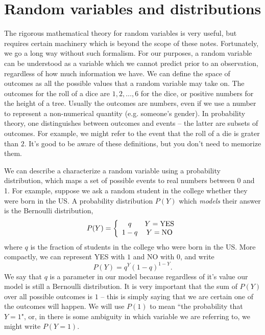 

\section{Random variables and distributions}

The rigorous mathematical theory for random variables is very useful, but requires certain machinery which is beyond the scope of these notes. Fortunately, we go a long way without such formalism. For our purposes, a random variable can be understood as a variable which we cannot predict prior to an observation, regardless of how much information we have.
We can define the space of  {\dfn outcomes} as all the possible values that a random variable may take on. The outcomes for the roll of a dice are $1,2,\dots,6$ for the dice, or positive numbers for the height of a tree.  Usually the outcomes are numbers, even if we use a number to represent a non-numerical quantity (e.g. someone's gender). In probability theory, one distinguishes between outcomes and {\dfn events} -- the latter are subsets of outcomes. For example, we might refer to the event that the roll of a die is grater than $2$. It's good to be aware of these definitions, but you don't need to memorize them.



We can describe a characterize a random variable using  a {\dfn probability distribution}, which maps a set of possible events to real numbers between 0 and 1.   For example, suppose we ask a random student in the college whether they were born in the US. A probability distribution $P(Y)$ which \emph{models} their answer is the {\dfn Bernoulli distribution},
\begin{equation}
P(Y) = \left\{ \begin{array}{cc}
q & Y={\rm YES}\\
1-q & Y={\rm NO}
\end{array}
 \right.
\end{equation}
where $q$ is the fraction of students in the college who were born in the US. More compactly, we can represent YES with $1$ and NO with $0$, and write
\begin{equation}
P(Y) = q^Y(1-q)^{1-Y}.
\end{equation}
  We say that $q$ is a {\dfn parameter} in our model because regardless of it's value our model is still a Bernoulli distribution.  It is very important that the sum of $P(Y)$ over all possible outcomes is $1$ -- this is simply saying that we are certain one of the outcomes will happen. We will use $P(1)$ to mean ``the probability that $Y=1$", or, in there is some ambiguity in which variable we are referring to, we might write $P(Y=1)$. 
 
